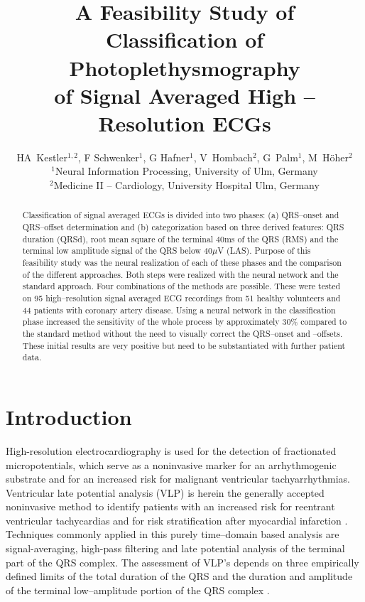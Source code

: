 \documentclass[twocolumn]{cinc}
\begin{document}


\title{A Feasibility Study of Classification of Photoplethysmography \\[-.4ex] of Signal Averaged
High -- Resolution ECGs}
\author{HA~Kestler$^{1,2}$, F Schwenker$^1$, G Hafner$^1$, V~Hombach$^2$, 
        G~Palm$^1$, M~H{\"o}her$^2$ \\[1em]
        $^1$Neural Information Processing, University of Ulm,  Germany \\[.25ex]
        $^2$Medicine II -- Cardiology, University Hospital Ulm, Germany\\[1em]
}

\maketitle






\begin{abstract}
Classification of signal averaged ECGs is divided into two phases: (a) QRS--onset and QRS--offset
determination and (b) categorization based on three derived features:
QRS duration (QRSd), root mean square of the terminal 40ms of the QRS (RMS) and the terminal
low amplitude signal of the QRS below 40$\mu$V (LAS). Purpose of this feasibility study was
the neural realization of each of these phases and the comparison of the different
approaches. Both steps were realized with the neural network 
and the standard approach. Four combinations of the methods are possible. 
These were tested on 95 high--resolution signal averaged ECG recordings from 51 healthy volunteers
and 44 patients with coronary artery disease.
Using a neural network in the classification phase increased the sensitivity of the whole
process by approximately 30\% compared to the standard method without the need to visually
correct the QRS--onset and --offsets. 
These initial results are very positive but need to be substantiated with further patient data.
\end{abstract}


\section{Introduction}

High-resolution electrocardiography is used for the detection of fractionated micropotentials, which serve
as a noninvasive marker for an arrhythmogenic substrate and for an increased risk for malignant 
ventricular tachy\-arrhythmias.
Ventricular late potential analysis (VLP) is herein the generally accepted noninvasive method to identify patients
with an increased risk for reentrant ventricular tachycardias and for risk stratification after myocardial
infarction \cite{med:gomes89,med:hoher91,med:simson81}. 
Techniques commonly applied in this purely time--domain based analysis are
signal-averaging, high-pass filtering and late potential analysis of the terminal part of the QRS complex.
The assessment of VLP's depends on three empirically defined limits of the total duration of the QRS and the 
duration and amplitude of the terminal low--amplitude portion of the QRS complex \cite{med:breithardt86,med:breithardt91}.
\end{document}
